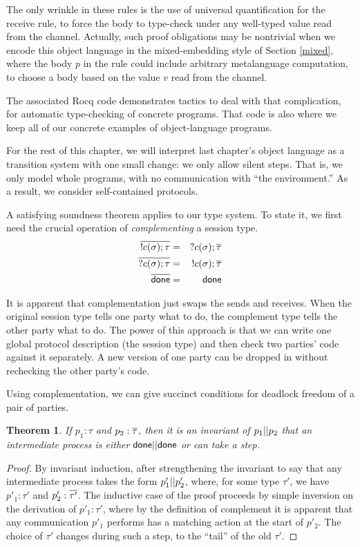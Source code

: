 \documentclass{amsbook}
\newtheorem{theorem}{Theorem}[chapter]
\theoremstyle{definition}
\theoremstyle{remark}
\numberwithin{section}{chapter}
\numberwithin{equation}{chapter}
\begin{document}
The only wrinkle in these rules is the use of universal quantification for the receive rule, to force the body to type-check under any well-typed value read from the channel.
Actually, such proof obligations may be nontrivial when we encode this object language in the mixed-embedding style of Section \ref{mixed}, where the body $p$ in the rule could include arbitrary metalanguage computation, to choose a body based on the value $v$ read from the channel.

The associated Rocq code demonstrates tactics to deal with that complication, for automatic type-checking of concrete programs.
That code is also where we keep all of our concrete examples of object-language programs.

For the rest of this chapter, we will interpret last chapter's object language as a transition system with one small change: we only allow silent steps.
That is, we only model whole programs, with no communication with ``the environment.''
As a result, we consider self-contained protocols.

A satisfying soundness theorem applies to our type system.  To state it, we first need the crucial operation of \emph{complementing} a session type.
\begin{eqnarray*}
  \overline{!c(\sigma); \tau} &=& ?c(\sigma); \overline{\tau} \\
  \overline{?c(\sigma); \tau} &=& !c(\sigma); \overline{\tau} \\
  \overline{\mathsf{done}} &=& \mathsf{done}
\end{eqnarray*}

\modularity
It is apparent that complementation just swaps the sends and receives.
When the original session type tells one party what to do, the complement type tells the other party what to do.
The power of this approach is that we can write one global protocol description (the session type) and then check two parties' code against it separately.
A new version of one party can be dropped in without rechecking the other party's code.

Using complementation, we can give succinct conditions for deadlock freedom of a pair of parties.

\begin{theorem}\label{stsound1}
  If $p_1 : \tau$ and $p_2 : \overline{\tau}$, then it is an invariant of $p_1 || p_2$ that an intermediate process is either $\mathsf{done} || \mathsf{done}$ or can take a step.
\end{theorem}
\begin{proof}
  By invariant induction, after strengthening the invariant to say that any intermediate process takes the form $p'_1 || p'_2$, where, for some type $\tau'$, we have $p'_1 : \tau'$ and $p'_2 : \overline{\tau'}$.
  The inductive case of the proof proceeds by simple inversion on the derivation of $p'_1 : \tau'$, where by the definition of complement it is apparent that any communication $p'_1$ performs has a matching action at the start of $p'_2$.
  The choice of $\tau'$ changes during such a step, to the ``tail'' of the old $\tau'$.
\end{proof}
\end{document}
